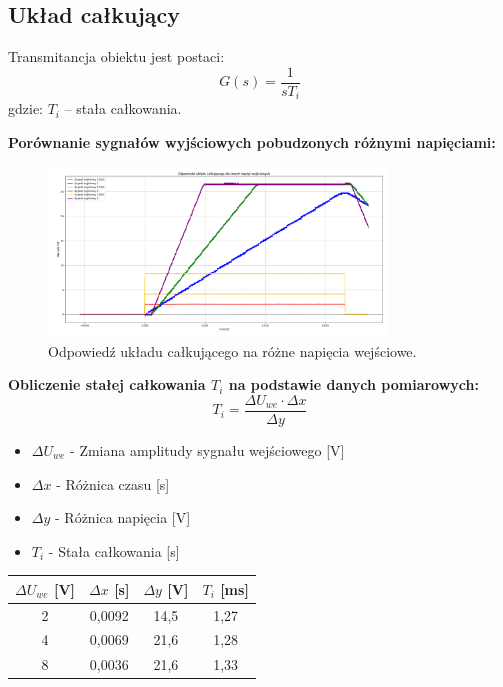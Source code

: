 \documentclass[12pt,a4paper]{article}
\begin{document}
	\subsection{Układ całkujący}
	Transmitancja obiektu jest postaci:
	\begin{equation}
		G(s) = \frac{1}{sT_i}
	\end{equation}
	gdzie: \(T_i\) – stała całkowania.
	
	\textbf{Porównanie sygnałów wyjściowych pobudzonych różnymi napięciami:}
	\begin{figure}[H]
		\centering
		\includegraphics[width=0.8\textwidth]{zdjecia/UkladCalk.png}
		\caption{Odpowiedź układu całkującego na różne napięcia wejściowe.}
		\label{fig:uklad_calk}
	\end{figure}
	
	\textbf{Obliczenie stałej całkowania $T_i$ na podstawie danych pomiarowych:}
	\[
	T_i = \frac{\Delta U_{we} \cdot \Delta x}{\Delta y}
	\]
	\begin{itemize}
		\item $\Delta U_{we}$ - Zmiana amplitudy sygnału wejściowego [V]
		\item $\Delta x$ - Różnica czasu [s]
		\item $\Delta y$ - Różnica napięcia [V]
		\item $T_i$ - Stała całkowania [s]
	\end{itemize}
	
	\begin{table}[h!]
		\centering
		\begin{tabular}{|c|c|c|c|}
			\hline
			$\Delta U_{we}$ [V] & $\Delta x$ [s] & $\Delta y$ [V] & $T_i$ [ms] \\
			\hline
			2 & 0,0092 & 14,5 & 1,27 \\
			4 & 0,0069 & 21,6 & 1,28 \\
			8 & 0,0036 & 21,6 & 1,33 \\
			\hline
		\end{tabular}
	\end{table}
	
\end{document}

